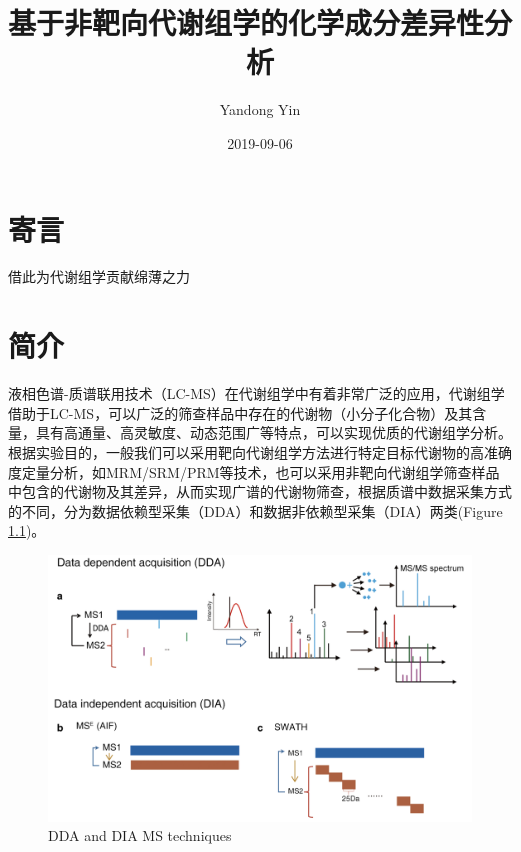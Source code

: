 \documentclass[]{ctexbook}
\title{基于非靶向代谢组学的化学成分差异性分析}
\author{Yandong Yin}
\date{2019-09-06}
\begin{document}
\maketitle


\thispagestyle{empty}

\begin{center}

\end{center}

\setlength{\abovedisplayskip}{-5pt}
\setlength{\abovedisplayshortskip}{-5pt}

{
\setcounter{tocdepth}{2}
\tableofcontents
}
\listoftables
\listoffigures
\hypertarget{Words}{%
\chapter*{寄言}\label{Words}}


借此为代谢组学贡献绵薄之力

\hypertarget{Intro}{%
\chapter{简介}\label{Intro}}

液相色谱-质谱联用技术（LC-MS）在代谢组学中有着非常广泛的应用，代谢组学借助于LC-MS，可以广泛的筛查样品中存在的代谢物（小分子化合物）及其含量，具有高通量、高灵敏度、动态范围广等特点，可以实现优质的代谢组学分析。根据实验目的，一般我们可以采用靶向代谢组学方法进行特定目标代谢物的高准确度定量分析，如MRM/SRM/PRM等技术，也可以采用非靶向代谢组学筛查样品中包含的代谢物及其差异，从而实现广谱的代谢物筛查，根据质谱中数据采集方式的不同，分为数据依赖型采集（DDA）和数据非依赖型采集（DIA）两类(Figure \ref{fig:DDAvsDIA})。

\begin{figure}
\centering
\includegraphics{Figures/Fig1.1.png}
\caption{\label{fig:DDAvsDIA}DDA and DIA MS techniques\citep{Wang:2019ig}}
\end{figure}
\end{document}
